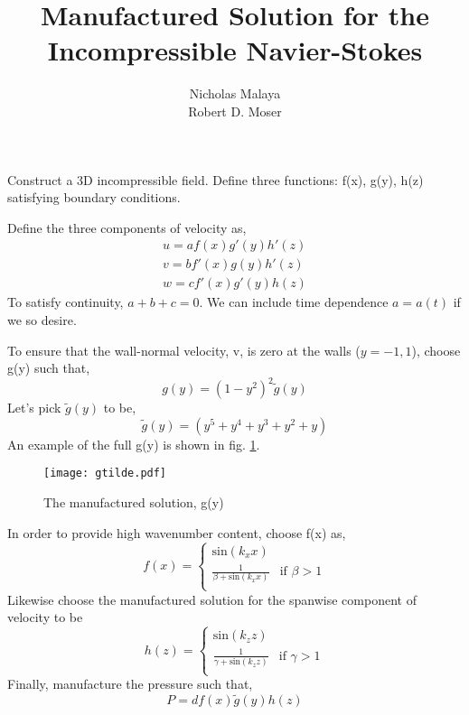\documentclass{article}
\title{\bf{Manufactured Solution for the Incompressible Navier-Stokes}}
\author{Nicholas Malaya \\ Robert D. Moser} \date{}
\begin{document}
\maketitle

Construct a 3D incompressible field. Define three functions: f(x), g(y),
h(z) satisfying boundary conditions. 

Define the three components of velocity as,
\begin{align}
u = a f(x)  g'(y)  h'(z) \\
v = b f'(x) g(y)   h'(z) \\
w = c f'(x) g'(y)  h(z) 
\end{align}
To satisfy continuity, $a+b+c=0$. We can include time dependence
$a=a(t)$ if we so desire.

To ensure that the wall-normal velocity, v, is  zero at the walls ($y=-1,1$), choose
g(y) such that, 
\begin{equation}
 g(y) = (1-y^2)^2 \tilde g(y)
\end{equation}
Let's pick $\tilde g(y)$ to be,
\begin{equation}
\tilde g(y) = (y^5 + y^4 + y^3 + y^2 + y)
\end{equation}
An example of the full g(y) is shown in fig. \ref{gy}.

\begin{figure}
 \centering
 \texttt{[image: gtilde.pdf]}
 \caption{The manufactured solution, g(y)}
 \label{gy}
\end{figure}


In order to provide high wavenumber content, choose f(x) as,
\begin{equation}
 f(x) =
  \begin{cases}
   \text{sin}(k_x x)  \\
   \frac{1}{\beta + \text{sin}(k_x x)} & \mbox{if } \beta > 1 \\
  \end{cases}
\end{equation}
Likewise choose the manufactured solution for the spanwise component of
velocity to be
\begin{equation}
 h(z) =
  \begin{cases}
   \text{sin}(k_z z)  \\
   \frac{1}{\gamma + \text{sin}(k_z z)} & \mbox{if } \gamma > 1 \\
  \end{cases}
\end{equation}
Finally, manufacture the pressure such that, 
\begin{equation}
 P = d f(x) \tilde g(y) h(z)
\end{equation}
\end{document}
